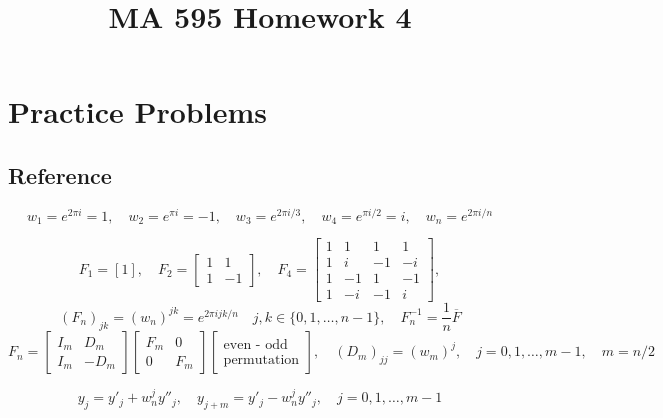 \documentclass[a4paper]{article}
\title{MA 595 Homework 4}
\begin{document}
\maketitle

\section*{Practice Problems}

\subsection*{Reference}

$$
w_1 = e^{2\pi i} = 1,\quad w_2 = e^{\pi i} = -1, \quad w_3 = e^{2\pi i / 3},\quad w_4 = e^{\pi i /2 } = i, \quad w_n = e^{2 \pi i / n}
$$

$$
F_1 = [1], \quad F_2 = \begin{bmatrix} 1&1 \\ 1&-1\end{bmatrix},
\quad F_4 =
\begin{bmatrix}
1 & 1 & 1 & 1 \\
1 & i &  -1 & -i \\
1 & -1 & 1 & -1 \\
1 & -i & -1 & i
\end{bmatrix},
$$
$$
(F_n)_{jk} = (w_n)^{jk} = e^{2\pi i j k /n} \quad j,k \in \{0,1,\dots, n-1\}, \quad F_n^{-1} = \frac{1}{n}\overline{F}
$$
$$
F_n = 
\begin{bmatrix} I_m & D_m \\ I_m & -D_m \end{bmatrix}
\begin{bmatrix} F_m & 0 \\ 0 & F_m \end{bmatrix}
\begin{bmatrix}
\text{even - odd} \\
\text{permutation}
\end{bmatrix}, \quad
(D_m)_{jj} = (w_m)^j, \quad j = 0,1,\dots , m-1, \quad m = n/2
$$

$$
y_j = y'_j + w_n^jy''_j, \quad y_{j+m} = y'_j - w_n^jy''_j, \quad j = 0,1,\dots,m-1
$$
\end{document}
